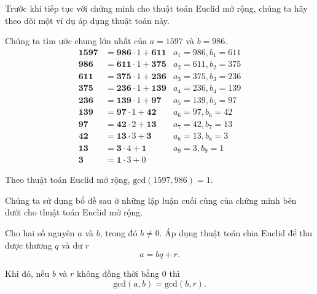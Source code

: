 Trước khi tiếp tục với chứng minh cho thuật toán Euclid mở rộng, chúng ta hãy theo dõi một ví dụ áp dụng thuật toán này.
\begin{example}
    Chúng ta tìm ước chung lớn nhất của $a = 1597$ và $b = 986$.
    \begin{align*}
        \mathbf{1597} & = \mathbf{986}\cdot 1 + \mathbf{611} & a_{1} = 986, b_{1} = 611 \\
        \mathbf{986}  & = \mathbf{611}\cdot 1 + \mathbf{375} & a_{2} = 611, b_{2} = 375 \\
        \mathbf{611}  & = \mathbf{375}\cdot 1 + \mathbf{236} & a_{3} = 375, b_{3} = 236 \\
        \mathbf{375}  & = \mathbf{236}\cdot 1 + \mathbf{139} & a_{4} = 236, b_{4} = 139 \\
        \mathbf{236}  & = \mathbf{139}\cdot 1 + \mathbf{97}  & a_{5} = 139, b_{5} = 97  \\
        \mathbf{139}  & = \mathbf{97}\cdot 1 + \mathbf{42}   & a_{6} = 97, b_{6} = 42   \\
        \mathbf{97}   & = \mathbf{42}\cdot 2 + \mathbf{13}   & a_{7} = 42, b_{7} = 13   \\
        \mathbf{42}   & = \mathbf{13}\cdot 3 + \mathbf{3}    & a_{8} = 13, b_{8} = 3    \\
        \mathbf{13}   & = \mathbf{3}\cdot 4 + \mathbf{1}     & a_{9} = 3, b_{9} = 1     \\
        \mathbf{3}    & = \mathbf{1}\cdot 3 + 0
    \end{align*}

    Theo thuật toán Euclid mở rộng, $\text{gcd}(1597, 986) = 1$.
\end{example}

Chúng ta sử dụng bổ đề sau ở những lập luận cuối cùng của chứng minh bên dưới cho thuật toán Euclid mở rộng.

\begin{lemma}
    Cho hai số nguyên $a$ và $b$, trong đó $b\ne 0$. Áp dụng thuật toán chia Euclid để thu được thương $q$ và dư $r$
    \[
        a = b q + r.
    \]

    \noindent Khi đó, nếu $b$ và $r$ không đồng thời bằng $0$ thì
    \[
        \text{gcd}(a, b) = \text{gcd}(b, r).
    \]
\end{lemma}

